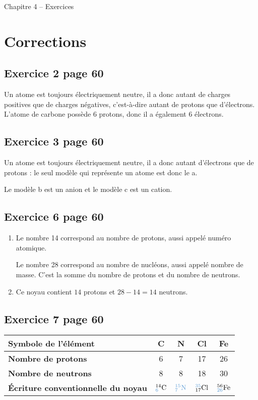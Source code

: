 \documentclass[12pt,a4paper]{article}
\begin{document}
\begin{header}
Chapitre 4 -- Exercices
\end{header}

\section*{Corrections}

\subsection*{Exercice 2 page 60}

Un atome est toujours électriquement neutre, il a donc autant de charges positives que de charges négatives, c'est-à-dire autant de protons que d'électrons.
L'atome de carbone possède 6 protons, donc il a également 6 électrons.

\subsection*{Exercice 3 page 60}

Un atome est toujours électriquement neutre, il a donc autant d'électrons que de protons : le seul modèle qui représente un atome est donc le a.

Le modèle b est un anion et le modèle c est un cation.

\subsection*{Exercice 6 page 60}

\begin{enumerate}
\item Le nombre 14 correspond au nombre de protons, aussi appelé numéro atomique.

Le nombre 28 correspond au nombre de nucléons, aussi appelé nombre de masse. C'est la somme du nombre de protons et du nombre de neutrons.

\item Ce noyau contient $14$ protons et $28-14=14$ neutrons.
\end{enumerate}

\subsection*{Exercice 7 page 60}

\begin{center}
\begin{tabular}{|l|c|c|c|c|}
\hline
\textbf{Symbole de l'élément}	& C & N & Cl & Fe \\
\hline
\textbf{Nombre de protons}		& 6 & 7 & \textcolor{bleu_f}{17} & 26 \\
\hline
\textbf{Nombre de neutrons}	& \textcolor{bleu_f}{8} & 8 & 18 & \textcolor{bleu_f}{30} \\
\hline
\textbf{Écriture conventionnelle du noyau} & $^{14}_{\color{bleu_f} {6}}\text{C}$ & $\color{bleu_f} ^{15}_{7}\text{N}$ & $^{\textcolor{bleu_f}{35}}_{17}\text{Cl}$ & $^{56}_{\color{bleu_f} {26}}\text{Fe}$ \\
\hline
\end{tabular}
\end{center}
\end{document}
